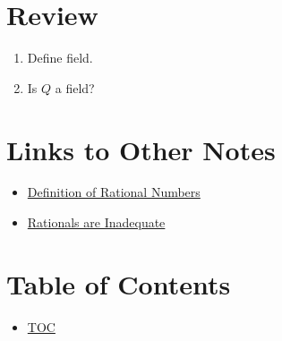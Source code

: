 \section*{Review}
\begin{enumerate}
  \item Define field.
  \item Is $Q$ a field?
\end{enumerate}


\section*{Links to Other Notes}
\begin{itemize}
  \item \hyperref[202501131947]{Definition of Rational Numbers}
  \item \hyperref[202501132004]{Rationals are Inadequate}
\end{itemize}

\section*{Table of Contents}

\begin{itemize}
  \item \hyperref[toc]{TOC}
\end{itemize}

